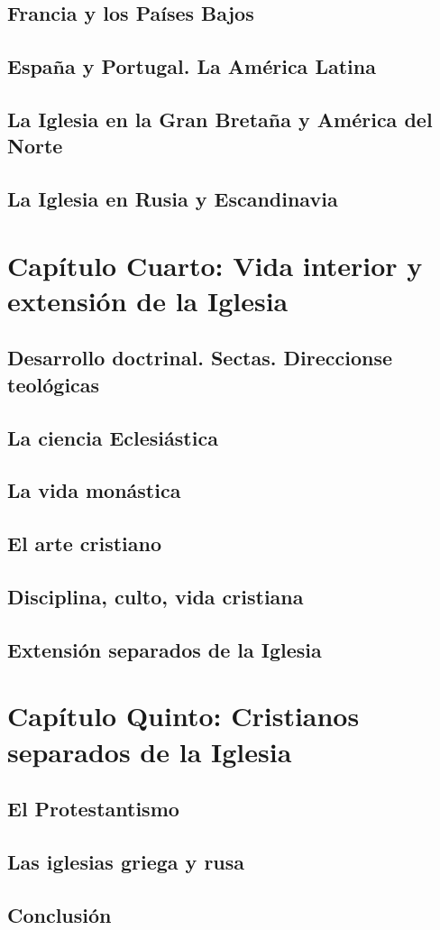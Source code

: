 \raggedbottom{} \documentclass[12pt, a4paper, openany]{book} %
\begin{document}
\section{Francia y los Países Bajos}
\section{España y Portugal. La América Latina}
\section{La Iglesia en la Gran Bretaña y América del Norte}
\section{La Iglesia en Rusia y Escandinavia}
\chapter{Capítulo Cuarto: Vida interior y extensión de la Iglesia}
\section{Desarrollo doctrinal. Sectas. Direccionse teológicas}
\section{La ciencia Eclesiástica}
\section{La vida monástica}
\section{El arte cristiano}
\section{Disciplina, culto, vida cristiana}
\section{Extensión separados de la Iglesia}
\chapter{Capítulo Quinto: Cristianos separados de la Iglesia}
\section{El Protestantismo}
\section{Las iglesias griega y rusa}
\section{Conclusión}
\printbibliography[heading=bibintoc]
\end{document}
